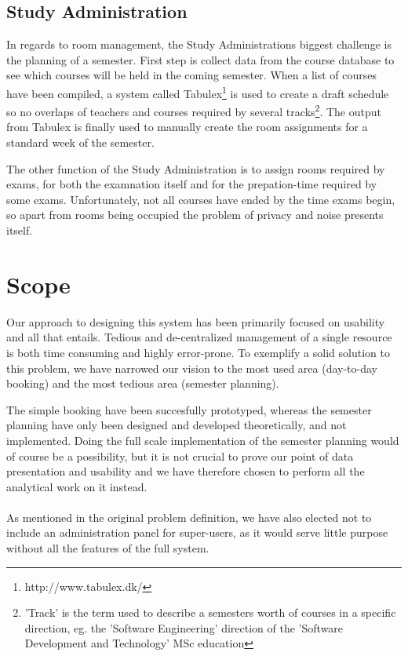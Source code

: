 \subsection{Study Administration}
In regards to room management, the Study Administrations biggest challenge is the planning of a semester. First step is collect data from the course database to see which courses will be held in the coming semester. When a list of courses have been compiled, a system called Tabulex\footnote{http://www.tabulex.dk/} is used to create a draft schedule so no overlaps of teachers and courses required by several tracks\footnote{'Track' is the term used to describe a semesters worth of courses in a specific direction, eg. the 'Software Engineering' direction of the 'Software Development and Technology' MSc education}. The output from Tabulex is finally used to manually create the room assignments for a standard week of the semester.

The other function of the Study Administration is to assign rooms required by exams, for both the examnation itself and for the prepation-time required by some exams. Unfortunately, not all courses have ended by the time exams begin, so apart from rooms being occupied the problem of privacy and noise presents itself.
\\
\section{Scope}
Our approach to designing this system has been primarily focused on usability and all that entails. Tedious and de-centralized management of a single resource is both time consuming and highly error-prone.
To exemplify a solid solution to this problem, we have narrowed our vision to the most used area (day-to-day booking) and the most tedious area (semester planning).

The simple booking have been succesfully prototyped, whereas the semester planning have only been designed and developed theoretically, and not implemented. Doing the full scale implementation of the semester planning would of course be a possibility, but it is not crucial to prove our point of data presentation and usability and we have therefore chosen to perform all the analytical work on it instead.
\\ \\
\noindent As mentioned in the original problem definition, we have also elected not to include an administration panel for super-users, as it would serve little purpose without all the features of the full system.

